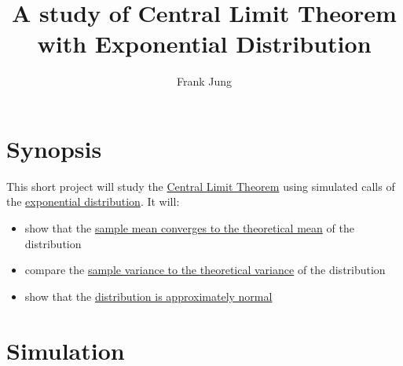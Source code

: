 \documentclass[legalpaper]{article}
\title{A study of Central Limit Theorem with Exponential Distribution}
\author{Frank Jung}
\date{}
\begin{document}
\maketitle


{
\hypersetup{linkcolor=black}
\setcounter{tocdepth}{2}
\tableofcontents
}
\section{Synopsis}\label{synopsis}

This short project will study the
\href{https://en.wikipedia.org/wiki/Central_limit_theorem}{Central Limit
Theorem} using simulated calls of the
\href{https://en.wikipedia.org/wiki/Exponential_distribution}{exponential
distribution}. It will:

\begin{itemize}
\itemsep1pt\parskip0pt
\item
  show that the \hyperref[sample-mean-versus-theoretical-mean]{sample
  mean converges to the theoretical mean} of the distribution
\item
  compare the \hyperref[sample-mean-versus-theoretical-mean]{sample
  variance to the theoretical variance} of the distribution
\item
  show that the
  \hyperref[distribution-is-approximately-normal]{distribution is
  approximately normal}
\end{itemize}

\section{Simulation}\label{simulation}
\end{document}
